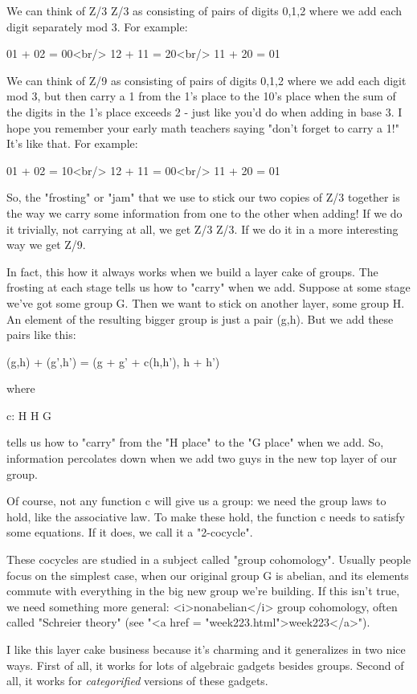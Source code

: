 We can think of Z/3 \oplus  Z/3 as consisting of pairs of digits 0,1,2
where we add each digit separately mod 3.  For example:

01 + 02 = 00<br/>
12 + 11 = 20<br/>
11 + 20 = 01

We can think of Z/9 as consisting of pairs of digits 0,1,2 where we
add each digit mod 3, but then carry a 1 from the 1's place to the
10's place when the sum of the digits in the 1's place exceeds 2 -
just like you'd do when adding in base 3.  I hope you remember your
early math teachers saying "don't forget to carry a 1!" It's
like that.  For example:

01 + 02 = 10<br/>
12 + 11 = 00<br/>
11 + 20 = 01

So, the "frosting" or "jam" that we use to stick
our two copies of Z/3 together is the way we carry some
information from one to the other when adding!  If we do it trivially,
not carrying at all, we get Z/3 \oplus  Z/3.  If we do it in a more
interesting way we get Z/9.

In fact, this how it always works when we build a layer cake
of groups.  The frosting at each stage tells us how to "carry"
when we add.  Suppose at some stage we've got some group G.  Then 
we want to stick on another layer, some group H.   An element of 
the resulting bigger group is just a pair (g,h).  But we add these
pairs like this:

(g,h) + (g',h') = (g + g' + c(h,h'), h + h')

where 

c: H \times  H \to  G

tells us how to "carry" from the "H place" to the
"G place" when we add.  So, information percolates down when
we add two guys in the new top layer of our group.

Of course, not any function c will give us a group: we
need the group laws to hold, like the associative law.  To 
make these hold, the function c needs to satisfy some equations.
If it does, we call it a "2-cocycle".  

These cocycles are studied in a subject called "group cohomology".
Usually people focus on the simplest case, when our original group 
G is abelian, and its elements commute with everything in the big 
new group we're building.  If this isn't true, we need something 
more general: <i>nonabelian</i> group cohomology, often
called "Schreier theory" (see "<a href = "week223.html">week223</a>").

I like this layer cake business because it's charming and it
generalizes in two nice ways.  First of all, it works for
lots of algebraic gadgets besides groups.  Second of all, it
works for \emph{categorified} versions of these gadgets.  

